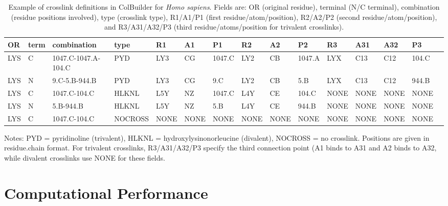 \documentclass[10pt,letterpaper]{article}
\begin{document}
\begin{table}[!ht]
    \centering
    \small
    \caption{Example of crosslink definitions in ColBuilder for \textit{Homo sapiens}. Fields are: OR (original residue), terminal (N/C terminal), combination (residue positions involved), type (crosslink type), R1/A1/P1 (first residue/atom/position), R2/A2/P2 (second residue/atom/position), and R3/A31/A32/P3 (third residue/atoms/position for trivalent crosslinks).}
    \setlength{\tabcolsep}{4pt}
    \begin{tabular}{l>{\raggedright\arraybackslash}p{0.8cm}l>{\raggedright\arraybackslash}p{1.2cm}lllllllllll}
    \hline
    OR & term & combination & type & R1 & A1 & P1 & R2 & A2 & P2 & R3 & A31 & A32 & P3 \\ \hline
    LYS & C & 1047.C-1047.A-104.C & PYD & LY3 & CG & 1047.C & LY2 & CB & 1047.A & LYX & C13 & C12 & 104.C \\
    LYS & N & 9.C-5.B-944.B & PYD & LY3 & CG & 9.C & LY2 & CB & 5.B & LYX & C13 & C12 & 944.B \\
    LYS & C & 1047.C-104.C & HLKNL & L5Y & NZ & 1047.C & L4Y & CE & 104.C & NONE & NONE & NONE & NONE \\
    LYS & N & 5.B-944.B & HLKNL & L5Y & NZ & 5.B & L4Y & CE & 944.B & NONE & NONE & NONE & NONE \\
    LYS & C & 1047.C-104.C & NOCROSS & NONE & NONE & NONE & NONE & NONE & NONE & NONE & NONE & NONE & NONE \\ \hline
    \end{tabular}
    \label{table:SI_crosslinks_def}
    \raggedright
    \small Notes: PYD = pyridinoline (trivalent), HLKNL = hydroxylysinonorleucine (divalent), NOCROSS = no crosslink. Positions are given in residue.chain format. For trivalent crosslinks, R3/A31/A32/P3 specify the third connection point (A1 binds to A31 and A2 binds to A32, while divalent crosslinks use NONE for these fields.
\end{table}

\section*{Computational Performance}
\end{document}
